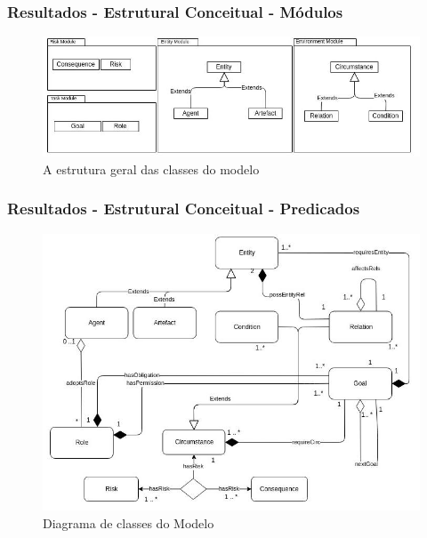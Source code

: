 \documentclass{beamer}
\begin{document}
\begin{frame}
	\frametitle{Resultados - Estrutural Conceitual - Módulos}
	\begin{figure}[H]
  		\centering
  			\includegraphics[width=1\linewidth]{../dissertacao/figure/Module.jpeg} 
  		\caption{A estrutura geral das classes do modelo}
  		\label{module}
	\end{figure}
\end{frame}

\begin{frame}
	\frametitle{Resultados - Estrutural Conceitual - Predicados}
	\begin{figure}[H]
  		\centering
  		\includegraphics[width=0.8\linewidth]{../dissertacao/figure/Class.jpeg} 
  		\caption{Diagrama de classes do Modelo}
  		\label{classdiagrama}
	\end{figure}
\end{frame}
\end{document}
